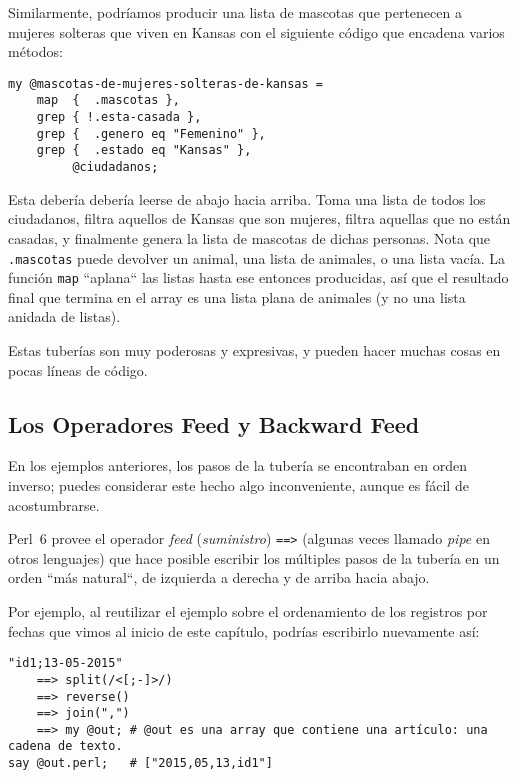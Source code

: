 Similarmente, podríamos producir una lista de mascotas que pertenecen
a mujeres solteras que viven en Kansas con el siguiente código que encadena
varios métodos:

\begin{verbatim}
my @mascotas-de-mujeres-solteras-de-kansas =
    map  {  .mascotas },
    grep { !.esta-casada },
    grep {  .genero eq "Femenino" },
    grep {  .estado eq "Kansas" },
         @ciudadanos;
\end{verbatim}
 
 

Esta debería debería leerse de abajo hacia arriba. Toma una
lista de todos los ciudadanos, filtra aquellos de Kansas que 
son mujeres, filtra aquellas que no están casadas, y finalmente
genera la lista de mascotas de dichas personas. Nota que \verb|.mascotas|
puede devolver un animal, una lista de animales, o una lista 
vacía. La función \verb|map| ``aplana`` las listas hasta ese entonces
producidas, así que el resultado final que termina en el array es una
lista plana de animales (y no una lista anidada de listas).

Estas tuberías son muy poderosas y expresivas, y pueden hacer muchas
cosas en pocas líneas de código.

\subsection{Los Operadores Feed y Backward Feed}

En los ejemplos anteriores, los pasos de la tubería se encontraban en 
orden inverso; puedes considerar este hecho algo inconveniente, aunque
es fácil de acostumbrarse.

Perl~6 provee el operador \emph{feed} (\emph{suministro}) \verb|==>|
(algunas veces llamado \emph{pipe} en otros lenguajes)
que hace posible escribir los múltiples pasos de la tubería en un orden
``más natural``, de izquierda a derecha y de arriba hacia abajo.
\ifplastex \else
{}
\fi

Por ejemplo, al reutilizar el ejemplo sobre el ordenamiento de
los registros por fechas que vimos al inicio de este capítulo,
podrías escribirlo nuevamente así:

\begin{verbatim}
"id1;13-05-2015" 
    ==> split(/<[;-]>/) 
    ==> reverse() 
    ==> join(",") 
    ==> my @out; # @out es una array que contiene una artículo: una cadena de texto.
say @out.perl;   # ["2015,05,13,id1"]
\end{verbatim}


